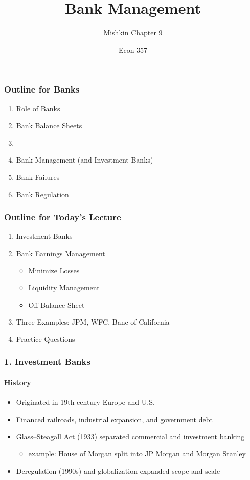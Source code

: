 \documentclass{beamer}
\title{Bank Management}
\subtitle{Mishkin Chapter 9}
\author{Econ 357}
\date{\week}
\begin{document}
\frame{\titlepage}

\begin{frame}
    \frametitle{Outline for Banks}
        \begin{enumerate}
            \item Role of Banks
            \item Bank Balance Sheets
            \item {}
            \item Bank Management (and Investment Banks)
            \item Bank Failures
            \item Bank Regulation
        \end{enumerate}
\end{frame}


\begin{frame}
    \frametitle{Outline for Today's Lecture}
    
    \begin{enumerate}
        \item Investment Banks 
        \item Bank Earnings Management
        \begin{itemize}
            \item Minimize Losses
            \item Liquidity Management
            \item Off-Balance Sheet
        \end{itemize}
        \item Three Examples: JPM, WFC, Banc of California
        \item Practice Questions
    \end{enumerate}

\end{frame}

\begin{frame}[t]
\frametitle{1. Investment Banks}
\framesubtitle{History}

    \begin{itemize}
        \item Originated in 19th century Europe and U.S. 
        \item Financed railroads, industrial expansion, and government debt
        \item Glass–Steagall Act (1933) separated commercial and investment banking 
        \begin{itemize}
            \item example: House of Morgan split into JP Morgan and Morgan Stanley
        \end{itemize}
        \item Deregulation (1990s) and globalization expanded scope and scale
    \end{itemize}
\end{frame}
\end{document}

